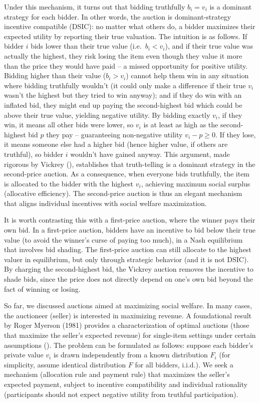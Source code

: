 \documentclass[
  letterpaper,
  numbers=noenddot,
  DIV=11]{scrreprt}
\theoremstyle{plain}
\theoremstyle{definition}
\theoremstyle{remark}
\begin{document}
Under this mechanism, it turns out that bidding truthfully \(b_i = v_i\)
is a dominant strategy for each bidder. In other words, the auction is
dominant-strategy incentive compatible (DSIC): no matter what others do,
a bidder maximizes their expected utility by reporting their true
valuation. The intuition is as follows. If bidder \(i\) bids lower than
their true value (i.e.~\(b_i < v_i\)), and if their true value was
actually the highest, they risk losing the item even though they value
it more than the price they would have paid -- a missed opportunity for
positive utility. Bidding higher than their value (\(b_i > v_i\)) cannot
help them win in any situation where bidding truthfully wouldn't (it
could only make a difference if their true \(v_i\) wasn't the highest
but they tried to win anyway); and if they do win with an inflated bid,
they might end up paying the second-highest bid which could be above
their true value, yielding negative utility. By bidding exactly \(v_i\),
if they win, it means all other bids were lower, so \(v_i\) is at least
as high as the second-highest bid \(p\) they pay -- guaranteeing
non-negative utility \(v_i - p \ge 0\). If they lose, it means someone
else had a higher bid (hence higher value, if others are truthful), so
bidder \(i\) wouldn't have gained anyway. This argument, made rigorous
by Vickrey (), establishes that
truth-telling is a dominant strategy in the second-price auction. As a
consequence, when everyone bids truthfully, the item is allocated to the
bidder with the highest \(v_i\), achieving maximum social surplus
(allocative efficiency). The second-price auction is thus an elegant
mechanism that aligns individual incentives with social welfare
maximization.

It is worth contrasting this with a first-price auction, where the
winner pays their own bid. In a first-price auction, bidders have an
incentive to bid below their true value (to avoid the winner's curse of
paying too much), in a Nash equilibrium that involves bid shading. The
first-price auction can still allocate to the highest valuer in
equilibrium, but only through strategic behavior (and it is not DSIC).
By charging the second-highest bid, the Vickrey auction removes the
incentive to shade bids, since the price does not directly depend on
one's own bid beyond the fact of winning or losing.

So far, we discussed auctions aimed at maximizing social welfare. In
many cases, the auctioneer (seller) is interested in maximizing revenue.
A foundational result by Roger Myerson (1981) provides a
characterization of optimal auctions (those that maximize the seller's
expected revenue) for single-item settings under certain assumptions
(). The problem can be
formulated as follows: suppose each bidder's private value \(v_i\) is
drawn independently from a known distribution \(F_i\) (for simplicity,
assume identical distribution \(F\) for all bidders, i.i.d.). We seek a
mechanism (allocation rule and payment rule) that maximizes the seller's
expected payment, subject to incentive compatibility and individual
rationality (participants should not expect negative utility from
truthful participation).
\end{document}
